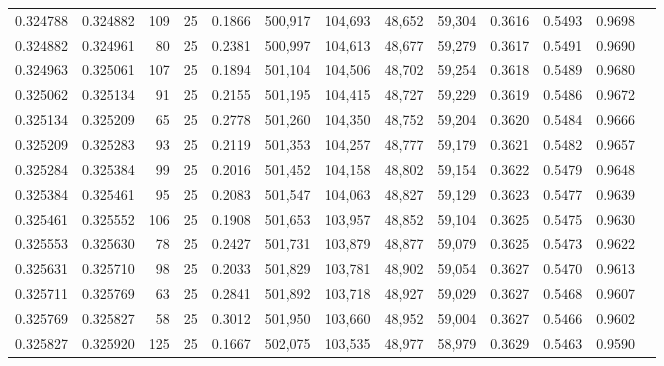 \begin{tabular}{rrrrrrrrrrrrr}
0.324788 & 0.324882 &   109 &  25 &                                     0.1866 & 500,917 & 104,693 &  48,652 &  59,304 & 0.3616 & 0.5493 & 0.9698 \\
0.324882 & 0.324961 &    80 &  25 &                                     0.2381 & 500,997 & 104,613 &  48,677 &  59,279 & 0.3617 & 0.5491 & 0.9690 \\
0.324963 & 0.325061 &   107 &  25 &                                     0.1894 & 501,104 & 104,506 &  48,702 &  59,254 & 0.3618 & 0.5489 & 0.9680 \\
0.325062 & 0.325134 &    91 &  25 &                                     0.2155 & 501,195 & 104,415 &  48,727 &  59,229 & 0.3619 & 0.5486 & 0.9672 \\
0.325134 & 0.325209 &    65 &  25 &                                     0.2778 & 501,260 & 104,350 &  48,752 &  59,204 & 0.3620 & 0.5484 & 0.9666 \\
0.325209 & 0.325283 &    93 &  25 &                                     0.2119 & 501,353 & 104,257 &  48,777 &  59,179 & 0.3621 & 0.5482 & 0.9657 \\
0.325284 & 0.325384 &    99 &  25 &                                     0.2016 & 501,452 & 104,158 &  48,802 &  59,154 & 0.3622 & 0.5479 & 0.9648 \\
0.325384 & 0.325461 &    95 &  25 &                                     0.2083 & 501,547 & 104,063 &  48,827 &  59,129 & 0.3623 & 0.5477 & 0.9639 \\
0.325461 & 0.325552 &   106 &  25 &                                     0.1908 & 501,653 & 103,957 &  48,852 &  59,104 & 0.3625 & 0.5475 & 0.9630 \\
0.325553 & 0.325630 &    78 &  25 &                                     0.2427 & 501,731 & 103,879 &  48,877 &  59,079 & 0.3625 & 0.5473 & 0.9622 \\
0.325631 & 0.325710 &    98 &  25 &                                     0.2033 & 501,829 & 103,781 &  48,902 &  59,054 & 0.3627 & 0.5470 & 0.9613 \\
0.325711 & 0.325769 &    63 &  25 &                                     0.2841 & 501,892 & 103,718 &  48,927 &  59,029 & 0.3627 & 0.5468 & 0.9607 \\
0.325769 & 0.325827 &    58 &  25 &                                     0.3012 & 501,950 & 103,660 &  48,952 &  59,004 & 0.3627 & 0.5466 & 0.9602 \\
0.325827 & 0.325920 &   125 &  25 &                                     0.1667 & 502,075 & 103,535 &  48,977 &  58,979 & 0.3629 & 0.5463 & 0.9590 \\

\end{tabular}
